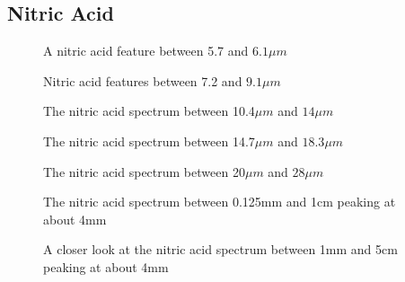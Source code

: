 \documentclass[12pt]{article}
\begin{document}
\subsection{Nitric Acid}

\vspace*{13.5cm}
\begin{figure}[htb]
\caption{A nitric acid feature between 5.7 and $6.1 \mu m$}
\end{figure}
\newpage

\vspace*{11.5cm}
\begin{figure}[htb]
\caption{Nitric acid features between 7.2 and $9.1 \mu m$}
\end{figure}
\newpage

\vspace*{11.5cm}
\begin{figure}[htb]
\caption{The nitric acid spectrum between  10.4$\mu m$  and $14 \mu m$}
\end{figure}
\newpage



\vspace*{11.5cm}
\begin{figure}[htb]
\caption{The nitric acid spectrum between  14.7$\mu m$  and $18.3\mu m$}
\end{figure}
\newpage


\vspace*{11.5cm}
\begin{figure}[htb]
\caption{The nitric acid spectrum between  20$\mu m$  and $28\mu m$}
\end{figure}
\newpage


\vspace*{11.5cm}
\begin{figure}[htb]
\caption{The nitric acid spectrum between  0.125mm  and 1cm peaking at about 4mm}
\end{figure}
\newpage


\vspace*{11.5cm}
\begin{figure}[htb]
\caption{A closer look at the nitric acid spectrum between  1mm  and 5cm peaking at about 4mm}
\end{figure}
\newpage
\end{document}
